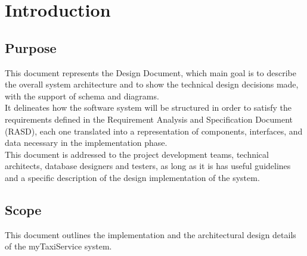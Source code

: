 \documentclass[18pt,oneside,a4paper, titlepage]{article}
\begin{document}
\newpage
\section{Introduction}		
	\subsection{Purpose}
		This document represents the Design Document, which main goal is to describe the overall system architecture and to show the technical design decisions made, with the support of schema and diagrams.\\ It delineates how the software system will be structured in order to satisfy the requirements defined in the Requirement Analysis and Specification Document (RASD), each one translated into a representation of components, interfaces, and data necessary in the implementation phase.
		\\This document is addressed to the project development teams, technical architects, database designers and testers, as long as it is has useful guidelines and a specific description of the design implementation of the system.
		
	\subsection{Scope}
		This document outlines the implementation and the architectural design details of the myTaxiService system.
\end{document}
